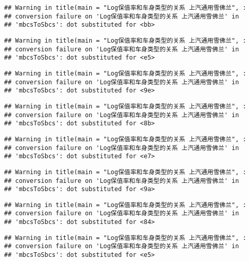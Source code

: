 \documentclass[]{article}
\begin{document}
\begin{verbatim}
## Warning in title(main = "Log保值率和车身类型的关系 上汽通用雪佛兰", :
## conversion failure on 'Log保值率和车身类型的关系 上汽通用雪佛兰' in
## 'mbcsToSbcs': dot substituted for <bb>
\end{verbatim}

\begin{verbatim}
## Warning in title(main = "Log保值率和车身类型的关系 上汽通用雪佛兰", :
## conversion failure on 'Log保值率和车身类型的关系 上汽通用雪佛兰' in
## 'mbcsToSbcs': dot substituted for <e5>
\end{verbatim}

\begin{verbatim}
## Warning in title(main = "Log保值率和车身类型的关系 上汽通用雪佛兰", :
## conversion failure on 'Log保值率和车身类型的关系 上汽通用雪佛兰' in
## 'mbcsToSbcs': dot substituted for <9e>
\end{verbatim}

\begin{verbatim}
## Warning in title(main = "Log保值率和车身类型的关系 上汽通用雪佛兰", :
## conversion failure on 'Log保值率和车身类型的关系 上汽通用雪佛兰' in
## 'mbcsToSbcs': dot substituted for <8b>
\end{verbatim}

\begin{verbatim}
## Warning in title(main = "Log保值率和车身类型的关系 上汽通用雪佛兰", :
## conversion failure on 'Log保值率和车身类型的关系 上汽通用雪佛兰' in
## 'mbcsToSbcs': dot substituted for <e7>
\end{verbatim}

\begin{verbatim}
## Warning in title(main = "Log保值率和车身类型的关系 上汽通用雪佛兰", :
## conversion failure on 'Log保值率和车身类型的关系 上汽通用雪佛兰' in
## 'mbcsToSbcs': dot substituted for <9a>
\end{verbatim}

\begin{verbatim}
## Warning in title(main = "Log保值率和车身类型的关系 上汽通用雪佛兰", :
## conversion failure on 'Log保值率和车身类型的关系 上汽通用雪佛兰' in
## 'mbcsToSbcs': dot substituted for <84>
\end{verbatim}

\begin{verbatim}
## Warning in title(main = "Log保值率和车身类型的关系 上汽通用雪佛兰", :
## conversion failure on 'Log保值率和车身类型的关系 上汽通用雪佛兰' in
## 'mbcsToSbcs': dot substituted for <e5>
\end{verbatim}
\end{document}
